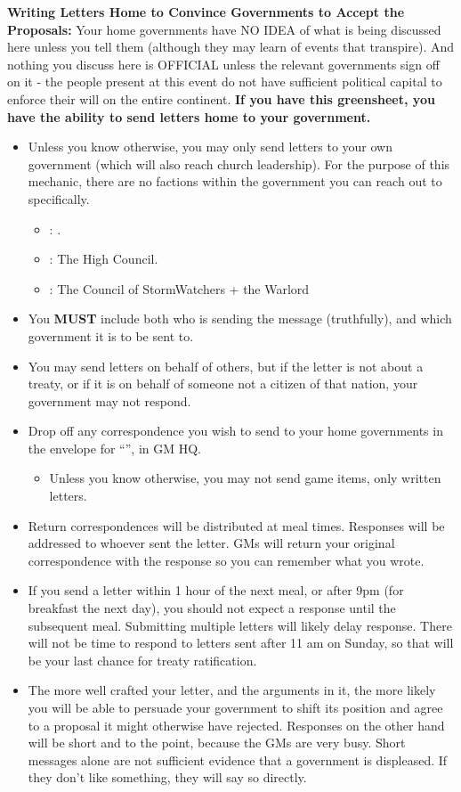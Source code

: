 \documentclass[green]{GL2020}
\begin{document}
\textbf{Writing Letters Home to Convince Governments to Accept the Proposals:}
Your home governments have NO IDEA of what is being discussed here unless you tell them (although they may learn of events that transpire). And nothing you discuss here is OFFICIAL unless the relevant governments sign off on it - the people present at this event do not have sufficient political capital to enforce their will on the entire continent. \textbf{If you have this greensheet, you have the ability to send letters home to your government.}
\begin{itemize}
  \item Unless you know otherwise, you may only send letters to your own government (which will also reach church leadership). For the purpose of this mechanic, there are no factions within the government you can reach out to specifically.
  \begin{itemize}
    \item \pFarm{}: \cQueen{\full}.
    \item \pTech{}: The High Council.
    \item \pShip{}: The Council of StormWatchers + the Warlord
  \end{itemize}
  \item You \textbf{MUST} include both who is sending the message (truthfully), and which government it is to be sent to.
  \item You may send letters on behalf of others, but if the letter is not about a treaty, or if it is on behalf of someone not a citizen of that nation, your government may not respond.
  \item Drop off any correspondence you wish to send to your home governments in the envelope for “\sSignT{}”, in GM HQ.
  \begin{itemize}
    \item Unless you know otherwise, you may not send game items, only written letters.
  \end{itemize}
  \item Return correspondences will be distributed at meal times. Responses will be addressed to whoever sent the letter. GMs will return your original correspondence with the response so you can remember what you wrote.
  \item If you send a letter within 1 hour of the next meal, or after 9pm (for breakfast the next day), you should not expect a response until the subsequent meal. Submitting multiple letters will likely delay response. There will not be time to respond to letters sent after 11 am on Sunday, so that will be your last chance for treaty ratification.
  \item The more well crafted your letter, and the arguments in it, the more likely you will be able to persuade your government to shift its position and agree to a proposal it might otherwise have rejected. Responses on the other hand will be short and to the point, because the GMs are very busy. Short messages alone are not sufficient evidence that a government is displeased. If they don’t like something, they will say so directly.
\end{itemize}
\end{document}
